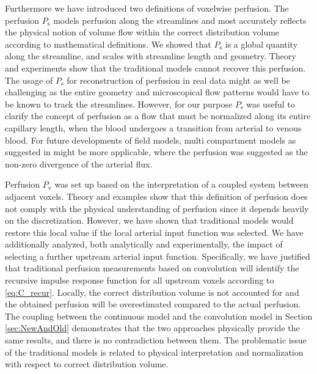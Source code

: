 \documentclass[journal,twocolumn]{IEEEtran}
\newcommand{\Perfv}{P_{\mathrm{v}}}
\newcommand{\Perfs}{P_{\mathrm{s}}}
\begin{document}
	Furthermore we have introduced two definitions of voxelwise perfusion.
	The perfusion $\Perfs$ models perfusion along the streamlines and most accurately reflects the physical notion of volume flow within the correct distribution volume according to mathematical definitions. We showed that $\Perfs$ is a global quantity along the streamline, and scales with streamline length and geometry.
	Theory and experiments show that the traditional models cannot recover this perfusion. The usage of $\Perfs$ for reconstruction of perfusion in real data might as well be challenging as the entire geometry and microscopical flow patterns would have to be known to track the streamlines. However, for our purpose $\Perfs$ was useful to clarify the concept of perfusion as a flow that must be normalized along its entire capillary length, when the blood undergoes a transition from arterial to venous blood. 
	For future developments of field models, multi compartment models as suggested in \cite{sourbron14} might be more applicable, where the perfusion was suggested as the non-zero divergence of the arterial flux.
	
	Perfusion $\Perfv$ was set up based on the interpretation of a coupled system between adjacent voxels. 
	Theory and examples show that this definition of perfusion does not comply with the physical understanding of perfusion since it depends heavily on the discretization.
	However, we have shown that traditional models would restore this local value if the local arterial input function was selected. 
	We have additionally analyzed, both analytically and experimentally, the impact of selecting a further upstream arterial input function.
	Specifically, we have justified that traditional perfusion measurements based on convolution will identify the recursive impulse response function for all upstream voxels according to \eqref{eq:C_recur}. 
Locally, the correct distribution volume is not accounted for and the obtained perfusion will be overestimated compared to the actual perfusion. The coupling between the continuous model and the convolution model in Section \ref{sec:NewAndOld} demonstrates that the two approaches physically provide the same results, and there is no contradiction between them. The problematic issue of the traditional models is related to physical interpretation and normalization with respect to correct distribution volume.
	
	
	
\end{document}

